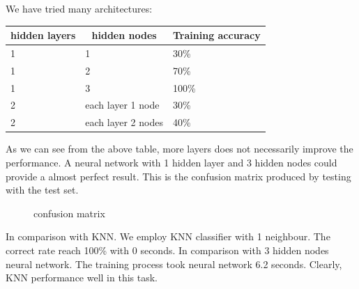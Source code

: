 \documentclass[11pt, a4paper, oneside, openright]{article}
\begin{document}
We have tried many architectures:
\begin{table}[H]
\begin{tabular}{|l|l|l|}
\hline
\multicolumn{1}{|c|}{\textbf{hidden layers}} & \multicolumn{1}{c|}{\textbf{hidden nodes}} 
& \multicolumn{1}{c|}{\textbf{Training accuracy}}\\
\hline
1     &1 &30\%                                    \\
\hline
1    &2 &70\%                                  \\
\hline
1   &3 &100\%                                             \\
\hline
2 &each layer 1 node &30\%                                            \\
\hline
2  &each layer 2 nodes &40\%                                              \\
\hline
\end{tabular}
\end{table}
As we can see from the above table, more layers does not necessarily improve the    performance. A neural network with 1 hidden layer and 3 hidden nodes could provide a almost perfect result.
This is the confusion matrix produced by testing with the test set.
  \begin{figure}[!ht]
  \centerline{}
  \caption{confusion matrix}
  \label{fig:confusion}
  \end{figure}
In comparison with KNN.
We employ KNN classifier with 1 neighbour.
The correct rate reach 100\% with 0 seconds.
In comparison with 3 hidden nodes neural network. The training process took neural network 6.2 seconds. Clearly, KNN performance well in this task.
\end{document}
